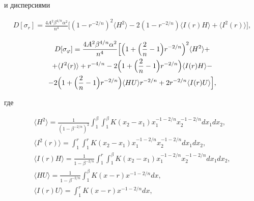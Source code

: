 и дисперсиями

\begin{gather}

D[\sigma_r]=\frac{4A^2\beta^{4/n}\alpha^2}{n^4}

\bigl[(1-r^{-2/n})^2\langle

H^2\rangle-2 (1-r^{-2/n})\langle

I(r)H\rangle+\langle I^2(r)\rangle\bigr],\label{eq:kov:4}

\end{gather}

\begin{multline}

D[\sigma_{\varphi}]=\frac{4A^2\beta^{4/n}\alpha^2}{n^4}

\Bigl[\Bigl(1+\Bigl(\frac{2}{n}-1\Bigr)r^{-2/n}\Bigr)^2

\langle H^2\rangle+ \\ + \langle I^2(r)\rangle+r^{-4/n}

-2\Bigl(1+\Bigl(\frac{2}{n}-1\Bigr)r^{-2/n}\Bigr)

\langle I(r)H\rangle-

\\

-2\Bigl(1+\Bigl(\frac{2}{n}-1\Bigr)r^{-2/n}\Bigr)\langle HU\rangle r^{-2/n}+2r^{-2/n}\langle

I(r)U\rangle\Bigr],\label{eq:kov:5}

\end{multline}



\noindent

где 

\begin{gather*}

\langle

H^2\rangle=\frac{1}{\left(1-\beta^{-2/n}\right)^2} \int _1^{\beta} \int _1^{\beta}{K(x_2-x_1)x_1^{-1-2/n}x_2^{-1-2/n}dx_1dx_2},

\\

\langle

I^2(r)\rangle= \int _1^{r} \int _1^{r}{K(x_2-x_1)x_1^{-1-2/n}x_2^{-1-2/n}dx_1dx_2},\\

\langle

I(r)H\rangle=\frac{1}{1-\beta^{-2/n}} \int _1^{r} \int _1^{\beta}{K(x_2-x_1)x_1^{-1-2/n}x_2^{-1-2/n}dx_1dx_2},

\\

\langle

HU\rangle=\frac{1}{1-\beta^{-2/n}} \int _1^{\beta}{K(x-r)x^{-1-2/n}dx},\\

\langle I(r)U\rangle= \int _1^{r}{K(x-r)x^{-1-2/n}dx},

\end{gather*}

